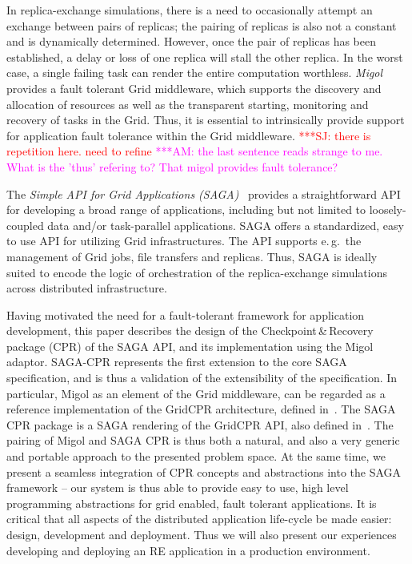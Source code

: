 \documentclass[times, 10pt, twocolumn]{article}
\newcommand{\amnote}[1]{ {\textcolor{magenta} { ***AM: #1 }}}
\newcommand{\jhanote}[1]{ {\textcolor{red} { ***SJ: #1 }}}
\newcommand{\amnote}[1]{}
\newcommand{\jhanote}[1]{}
\begin{document}
In replica-exchange simulations, there is a need to occasionally
attempt an exchange between pairs of replicas; the pairing of replicas
is also not a constant and is dynamically determined. However, once
the pair of replicas has been established, a delay or loss of one
replica will stall the other replica. In the worst case, a single
failing task can render the entire computation worthless.
\emph{Migol}~\cite{schnorLuckow08} provides a fault tolerant Grid
middleware, which supports the discovery and allocation of resources
as well as the transparent starting, monitoring and recovery of tasks
in the Grid.  Thus, it is essential to intrinsically provide support
for application fault tolerance within the Grid middleware.
\jhanote{there is repetition here. need to refine}
\amnote{the last sentence reads strange to me.  What is the 'thus'
refering to?  That migol provides fault tolerance?}

The \emph{Simple API for Grid Applications (SAGA)}~\cite{saga_gfd90}
provides a straightforward API for developing a broad range of
applications, including but not limited to loosely-coupled data and/or
task-parallel applications.
SAGA offers a standardized, easy to use API for utilizing Grid
infrastructures. The API supports e.\,g.\ the management of Grid jobs,
file transfers and replicas. Thus, SAGA is ideally suited to encode
the logic of orchestration of the replica-exchange simulations across
distributed infrastructure.

Having motivated the need for a fault-tolerant framework for
application development, this paper describes the design of the
Checkpoint\,\&\,Recovery package (CPR) of the SAGA API, and its
implementation using the Migol adaptor. SAGA-CPR represents the first
extension to the core SAGA specification, and is thus a validation of
the extensibility of the specification.  In particular, Migol as an
element of the Grid middleware, can be regarded as a reference
implementation of the GridCPR architecture, defined
in~\cite{ogf_cpr_arch}.  The SAGA CPR package is a SAGA rendering of
the GridCPR API, also defined in~\cite{ogf_cpr_arch}.  The pairing of
Migol and SAGA CPR is thus both a natural, and also a very generic and
portable approach to the presented problem space.  At the same time,
we present a seamless integration of CPR concepts and abstractions
into the SAGA framework -- our system is thus able to provide easy to
use, high level programming abstractions for grid enabled, fault
tolerant applications.  It is critical that all aspects of the
distributed application life-cycle be made easier: design, development
and deployment. Thus we will also present our experiences developing
and deploying an RE application in a production environment.
\end{document}
